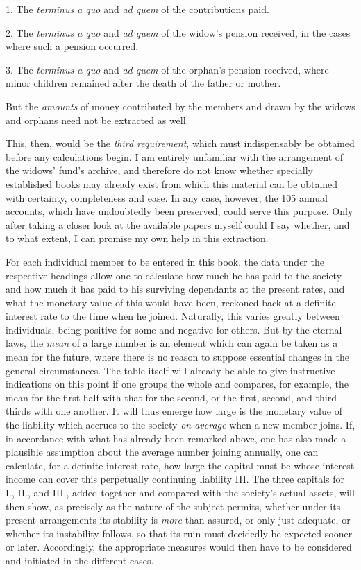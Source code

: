 1. The \textit{terminus a quo} and \textit{ad quem} of the contributions paid.

2. The \textit{terminus a quo} and \textit{ad quem} of the widow's pension received, in the cases where such a pension occurred.

3. The \textit{terminus a quo} and \textit{ad quem} of the orphan's pension received, where minor children remained after the death of the father or mother.

But the \textit{amounts} of money contributed by the members and drawn by the widows and orphans need not be extracted as well.

This, then, would be the \textit{third requirement}, which must indispensably be obtained before any calculations begin. I am entirely unfamiliar with the arrangement of the widows' fund's archive, and therefore do not know whether specially established books may already exist from which this material can be obtained with certainty, completeness
and ease. In any case, however, the 105 annual accounts, which have undoubtedly been preserved, could serve this purpose. Only after taking a closer look at the available papers myself could I say whether, and to what extent, I can promise my own help in this extraction.

For each individual member to be entered in this book, the data under the respective headings allow one to calculate how much he has paid to the society and how much it has paid to his surviving dependants at the present rates, and what the monetary value of this would have been, reckoned back at a definite interest rate to the time when he joined. Naturally, this varies greatly between individuals, being positive for some and negative for others. But by the eternal laws, the \textit{mean} of a large number is an element which can again be taken as a mean for the future, where there is no reason to suppose essential changes in the general circumstances. The table itself will already be able to give instructive indications on this point if one groups the whole and compares, for example, the mean for the first half with that for the second, or the first, second, and third thirds with one another. It will thus emerge how large is the monetary value of the liability which accrues to the society \textit{on average} when a new member joins. If, in accordance with what has already been remarked above, one has also made a plausible assumption about the average number joining annually, one can calculate, for a definite interest rate, how large the capital must be whose interest income can cover this perpetually continuing liability III. The three capitals for I., II., and III., added together and compared with the society's actual assets, will then show, as precisely as the nature of the subject permits, whether under its present arrangements its stability is \textit{more} than assured, or only just adequate, or whether its instability follows, so that its ruin must decidedly be expected sooner or later. Accordingly, the appropriate measures would then have to be considered and initiated in the different cases.


